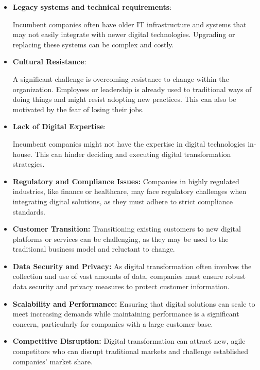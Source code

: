 \documentclass[a4]{scrartcl}
\begin{document}
	\begin{itemize}
		\item \textbf{Legacy systems and technical requirements}: 
		
		Incumbent companies often have older IT infrastructure and systems that may not easily integrate with newer digital technologies. Upgrading or replacing these systems can be complex and costly.
		
		\item \textbf{Cultural Resistance}: 
		
		A significant challenge is overcoming resistance to change within the organization. Employees or leadership is already used to traditional ways of doing things and might resist adopting new practices. This can also be motivated by the fear of losing their jobs.
		
		\item \textbf{Lack of Digital Expertise}: 
		
		Incumbent companies might not have the expertise in digital technologies in-house. This can hinder deciding and executing  digital transformation strategies.
		
		\item \textbf{Regulatory and Compliance Issues:} Companies in highly regulated industries, like finance or healthcare, may face regulatory challenges when integrating digital solutions, as they must adhere to strict compliance standards.
		
		\item \textbf{Customer Transition:} Transitioning existing customers to new digital platforms or services can be challenging, as they may be used to the traditional business model and reluctant to change.
		
		\item \textbf{Data Security and Privacy:} As digital transformation often involves the collection and use of vast amounts of data, companies must ensure robust data security and privacy measures to protect customer information.
		
		\item \textbf{Scalability and Performance:} Ensuring that digital solutions can scale to meet increasing demands while maintaining performance is a significant concern, particularly for companies with a large customer base.
		
		\item \textbf{Competitive Disruption:} Digital transformation can attract new, agile competitors who can disrupt traditional markets and challenge established companies' market share.
		

\end{itemize}
\end{document}

